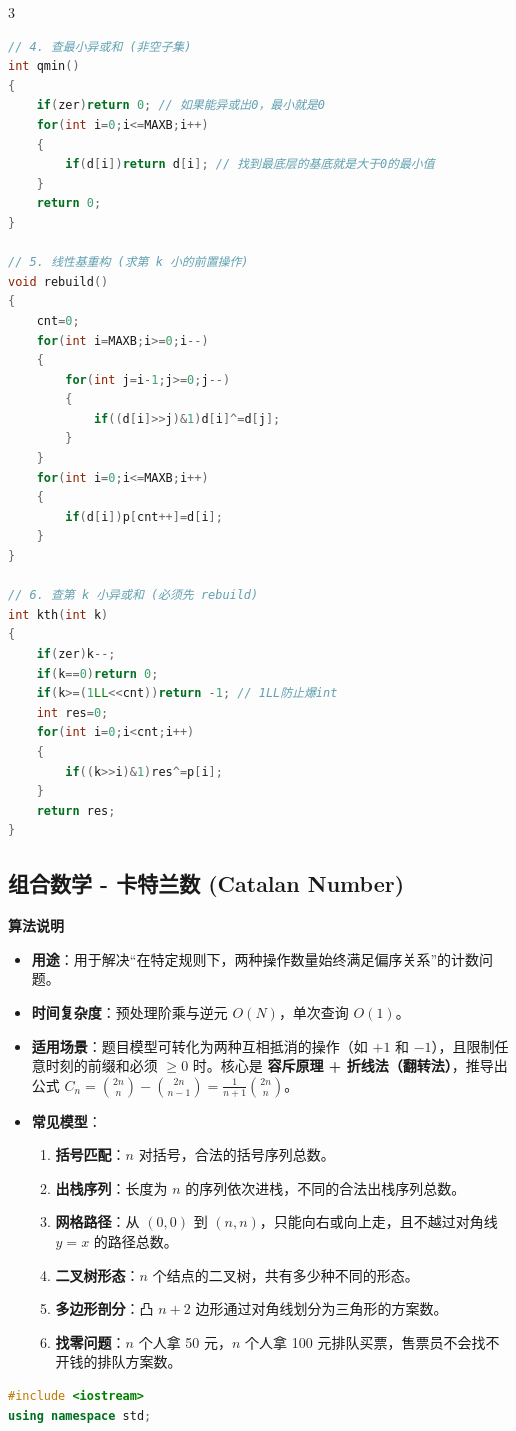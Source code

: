 \documentclass[10pt,landscape,a4paper]{article}
\begin{document}
\begin{multicols*}{3}
\begin{lstlisting}[language=C++]
// 4. 查最小异或和 (非空子集)
int qmin()
{
    if(zer)return 0; // 如果能异或出0，最小就是0
    for(int i=0;i<=MAXB;i++)
    {
        if(d[i])return d[i]; // 找到最底层的基底就是大于0的最小值
    }
    return 0;
}

// 5. 线性基重构 (求第 k 小的前置操作)
void rebuild()
{
    cnt=0;
    for(int i=MAXB;i>=0;i--)
    {
        for(int j=i-1;j>=0;j--)
        {
            if((d[i]>>j)&1)d[i]^=d[j];
        }
    }
    for(int i=0;i<=MAXB;i++)
    {
        if(d[i])p[cnt++]=d[i];
    }
}

// 6. 查第 k 小异或和 (必须先 rebuild)
int kth(int k)
{
    if(zer)k--;
    if(k==0)return 0;
    if(k>=(1LL<<cnt))return -1; // 1LL防止爆int
    int res=0;
    for(int i=0;i<cnt;i++)
    {
        if((k>>i)&1)res^=p[i];
    }
    return res;
}
\end{lstlisting}
\subsection*{组合数学 - 卡特兰数 (Catalan Number)}
\par\addvspace{0.7ex}\noindent\textbf{算法说明}\par\nobreak
\begin{itemize}
\item \textbf{用途}：用于解决“在特定规则下，两种操作数量始终满足偏序关系”的计数问题。
\item \textbf{时间复杂度}：预处理阶乘与逆元 $O(N)$，单次查询 $O(1)$。
\item \textbf{适用场景}：题目模型可转化为两种互相抵消的操作（如 $+1$ 和 $-1$），且限制任意时刻的前缀和必须 $\ge 0$ 时。核心是 \textbf{容斥原理 + 折线法（翻转法）}，推导出公式 $C_n = \binom{2n}{n} - \binom{2n}{n-1} = \frac{1}{n+1} \binom{2n}{n}$。
\item \textbf{常见模型}：
\begin{enumerate}[start=1]
\item \textbf{括号匹配}：$n$ 对括号，合法的括号序列总数。
\item \textbf{出栈序列}：长度为 $n$ 的序列依次进栈，不同的合法出栈序列总数。
\item \textbf{网格路径}：从 $(0,0)$ 到 $(n,n)$，只能向右或向上走，且不越过对角线 $y=x$ 的路径总数。
\item \textbf{二叉树形态}：$n$ 个结点的二叉树，共有多少种不同的形态。
\item \textbf{多边形剖分}：凸 $n+2$ 边形通过对角线划分为三角形的方案数。
\item \textbf{找零问题}：$n$ 个人拿 50 元，$n$ 个人拿 100 元排队买票，售票员不会找不开钱的排队方案数。
\end{enumerate}
\end{itemize}
\par{}\par
\begin{lstlisting}[language=C++]
#include <iostream>
using namespace std;


\end{lstlisting}
\end{multicols*}
\end{document}
